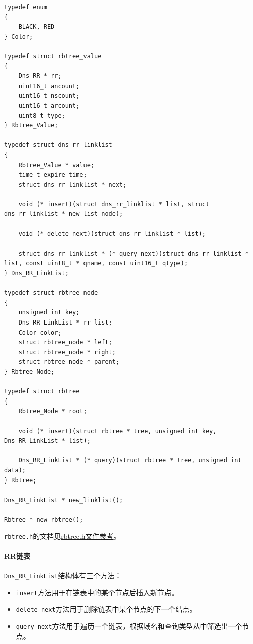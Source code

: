 \documentclass[lang=cn,11pt,a4paper,cite=authornum]{paper}
\begin{document}
\begin{code}
\begin{verbatim}
typedef enum
{
    BLACK, RED
} Color;
 
typedef struct rbtree_value
{
    Dns_RR * rr; 
    uint16_t ancount; 
    uint16_t nscount; 
    uint16_t arcount; 
    uint8_t type; 
} Rbtree_Value;
 
typedef struct dns_rr_linklist
{
    Rbtree_Value * value; 
    time_t expire_time; 
    struct dns_rr_linklist * next; 
    
    void (* insert)(struct dns_rr_linklist * list, struct dns_rr_linklist * new_list_node);
    
    void (* delete_next)(struct dns_rr_linklist * list);
    
    struct dns_rr_linklist * (* query_next)(struct dns_rr_linklist * list, const uint8_t * qname, const uint16_t qtype);
} Dns_RR_LinkList;
 
typedef struct rbtree_node
{
    unsigned int key; 
    Dns_RR_LinkList * rr_list; 
    Color color; 
    struct rbtree_node * left; 
    struct rbtree_node * right; 
    struct rbtree_node * parent; 
} Rbtree_Node;
 
typedef struct rbtree
{
    Rbtree_Node * root; 
    
    void (* insert)(struct rbtree * tree, unsigned int key, Dns_RR_LinkList * list);
    
    Dns_RR_LinkList * (* query)(struct rbtree * tree, unsigned int data);
} Rbtree;
 
Dns_RR_LinkList * new_linklist();
 
Rbtree * new_rbtree();
\end{verbatim}
\end{code}

\texttt{rbtree.h}的文档见\href{run:./APIdoc/rbtree_8h.html}{rbtree.h文件参考}。

\paragraph{RR链表}\label{rr_linklist}

\texttt{Dns_RR_LinkList}结构体有三个方法：

\begin{itemize}
    \item \texttt{insert}方法用于在链表中的某个节点后插入新节点。
    \item \texttt{delete_next}方法用于删除链表中某个节点的下一个结点。
    \item \texttt{query_next}方法用于遍历一个链表，根据域名和查询类型从中筛选出一个节点。
\end{itemize}
\end{document}
